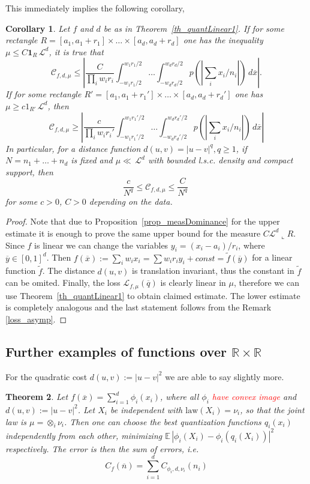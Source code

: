 \documentclass{amsart}
\newtheorem{theorem}{Theorem}[section]
\newtheorem{corollary}[theorem]{Corollary}
\theoremstyle{remark}
\numberwithin{equation}{section}
\numberwithin{figure}{section}
\newcommand{\R}{\mathbb{R}}
\def\E{\mathbb{E}\,}
\def\1{\mathbf{1}}
\def\v{\overline}
\newcommand{\res}{\llcorner}
\begin{document}
This immediately implies the following corollary,

\begin{corollary}
	Let $f$ and $d$ be as in Theorem~\ref{th_quantLinear1}. If for some rectangle $R = [a_1, a_1 + r_1] \times \ldots \times [a_d, a_d + r_d]$ one has the inequality $\mu \leq C \1_R \, \mathcal{L}^d$, it is true that
	\[
	\mathcal{C}_{f, d, \mu} 
	 \leq \left|\frac{C}{\prod_i w_i r_i} \int_{-w_1r_1/2}^{w_1r_1/2}\ldots \int_{-w_dr_d/2}^{w_dr_d/2} p\left(\left|\sum_{i} x_i/n_i\right|\right)\, d\v x\right|.
	\]
	If for some rectangle $R' = [a_1, a_1+r_1']\times\ldots\times [a_d, a_d+r_d']$ one has $\mu \geq c 1_{R'}\, \mathcal{L}^d$, then
	\[
	\mathcal{C}_{f, d, \mu} 
	 \geq \left|\frac{c}{\prod_i w_i r_i'} \int_{-w_1r_1'/2}^{w_1r_1'/2}\ldots \int_{-w_dr_d'/2}^{w_dr_d'/2} p\left(\left|\sum_{i} x_i/n_i\right|\right)\, d\v x\right|
	\]
	In particular, for a distance function $d(u, v) = |u-v|^q, q\geq 1$, if $N=n_1+\ldots + n_d$ is fixed and $\mu\ll \, \mathcal{L}^d$ with bounded l.s.c. density and compact support, then
	\[
	\frac{c}{N^q}\leq \mathcal{C}_{f, d, \mu} \leq 	\frac{C}{N^q}\
	\]
	for some $c>0$, $C>0$ depending on the data. 
\end{corollary}	

\begin{proof}
	Note that due to Proposition~\ref{prop_measDominance} for the upper estimate it is enough to prove the same upper bound for the measure $C \mathcal{L}^d\res R$. Since $f$ is linear we can change the variables $y_i = (x_i-a_i)/r_i$, where $\v y \in [0, 1]^d$. Then $f(\v x) := \sum_i w_i x_i = \sum w_i r_i y_i + const = \tilde f (\v y)$ for a linear function $\tilde f$. The distance $d(u, v)$ is translation invariant, thus the constant in $\tilde f$ can be omited. Finally, the loss $\mathcal{L}_{f, \mu} (\v q)$ is clearly linear in $\mu$, therefore we can use Theorem~\ref{th_quantLinear1} to obtain claimed estimate.
	The lower estimate is completely analogous and the last statement follows from the Remark \ref{loss_asymp}.
\end{proof}	

\subsection{Further examples of functions over $\R\times \R$}

For the quadratic cost $d(u, v) := |u-v|^2$ we are able to say slightly more. 

\begin{theorem}
	Let $f(\v x) = \sum_{i = 1}^d \phi_i(x_i)$, where all $\phi_i$ \textcolor{red}{have convex image} and $d(u, v) := |u-v|^2$. Let $X_i$ be independent with $\mathrm{law}(X_i)=\nu_i$, so that the joint law is $\mu = \otimes_i \nu_i$. Then one can choose the best quantization functions $q_i(x_i)$ independently from each other, minimizing $\E |\phi_i(X_i) - \phi_i(q_i(X_i))|^2$ respectively.
	The error is then the sum of errors, i.e. 
	\[
	C_f(\v n) =
 \sum_{i = 1}^d C_{\phi_i, d, \nu_i}(n_i)
	\]	
\end{theorem}	
\end{document}
